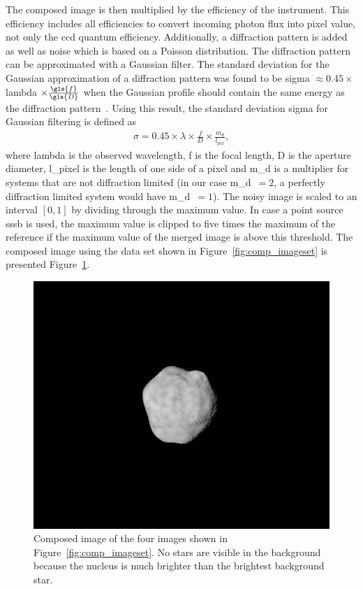The composed image is then multiplied by the efficiency of the instrument. This efficiency includes all efficiencies to convert incoming photon flux into pixel value, not only the \gls{ccd} quantum efficiency. Additionally, a diffraction pattern is added as well as noise which is based on a Poisson distribution. The diffraction pattern can be approximated with a Gaussian filter. The standard deviation for the Gaussian approximation of a diffraction pattern was found to be \gls{sigma} $\approx 0.45 \times$ \gls{lambda} $\times \frac{\gls{f}}{\gls{D}}$ when the Gaussian profile should contain the same energy as the diffraction pattern~\cite{Zhang2007GaussianModels}. Using this result, the standard deviation \gls{sigma} for Gaussian filtering is defined as
\begin{align}
    \sigma = 0.45 \times \lambda \times \frac{f}{D} \times \frac{m_d}{l_{pix}}, \label{eq:comp_sigma}
\end{align}
where \gls{lambda} is the observed wavelength, \gls{f} is the focal length, \gls{D} is the aperture diameter, \gls{l_pixel} is the length of one side of a pixel and \gls{m_d} is a multiplier for systems that are not diffraction limited (in our case \gls{m_d}~$= 2$, a perfectly diffraction limited system would have \gls{m_d}~$= 1$). The noisy image is scaled to an interval $[0,1]$ by dividing through the maximum value. In case a point source \gls{sssb} is used, the maximum value is clipped to five times the maximum of the reference if the maximum value of the merged image is above this threshold. The composed image using the data set shown in Figure~\ref{fig:comp_imageset} is presented Figure~\ref{fig:comp_composed}.

\begin{figure}[htb]
    \centering
    \includegraphics[width=\textwidth]{doc/thesis/0_figures/composition/Comp_2017-08-15T115854-575000.png}
    \caption{Composed image of the four images shown in Figure~\ref{fig:comp_imageset}. No stars are visible in the background because the nucleus is much brighter than the brightest background star.}
    \label{fig:comp_composed}
\end{figure}


